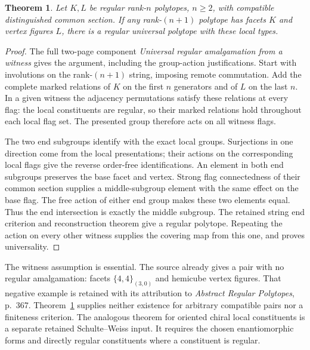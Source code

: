 \documentclass[11pt,a4paper]{article}
\newtheorem{theorem}{Theorem}
\begin{document}
\begin{theorem}\label{universal}
Let $K,L$ be regular rank-$n$ polytopes, $n\ge2$, with
compatible distinguished common section. If any rank-$(n+1)$
polytope has facets $K$ and vertex figures $L$, there is a
regular universal polytope with these local types.
\end{theorem}
\begin{proof}
The full two-page component \emph{Universal regular amalgamation
from a witness} gives the argument, including the group-action
justifications. Start with involutions on the rank-$(n+1)$
string, imposing remote commutation. Add the complete marked
relations of $K$ on the first $n$ generators and of $L$ on
the last $n$. In a given witness the adjacency permutations
satisfy these relations at every flag: the local constituents
are regular, so their marked relations hold throughout each
local flag set. The presented group therefore acts on all
witness flags.

The two end subgroups identify with the exact local groups.
Surjections in one direction come from the local presentations;
their actions on the corresponding local flags give the reverse
order-free identifications. An element in both end subgroups
preserves the base facet and vertex. Strong flag connectedness
of their common section supplies a middle-subgroup element with
the same effect on the base flag. The free action of either
end group makes these two elements equal. Thus the end
intersection is exactly the middle subgroup. The retained
string end criterion and reconstruction theorem give a regular
polytope. Repeating the action on every other witness supplies
the covering map from this one, and proves universality.
\end{proof}
The witness assumption is essential. The source already gives
a pair with no regular amalgamation: facets $\{4,4\}_{(3,0)}$
and hemicube vertex figures. That negative example is retained
with its attribution to \emph{Abstract Regular Polytopes},
p.~367. Theorem~\ref{universal} supplies neither existence
for arbitrary compatible pairs nor a finiteness criterion.
The analogous theorem for oriented chiral local constituents
is a separate retained Schulte--Weiss input. It requires the
chosen enantiomorphic forms and directly regular constituents
where a constituent is regular.
\end{document}
